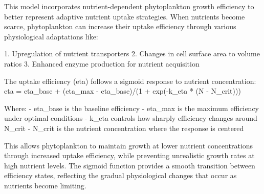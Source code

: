 This model incorporates nutrient-dependent phytoplankton growth efficiency to better represent adaptive nutrient uptake strategies. When nutrients become scarce, phytoplankton can increase their uptake efficiency through various physiological adaptations like:

1. Upregulation of nutrient transporters
2. Changes in cell surface area to volume ratios
3. Enhanced enzyme production for nutrient acquisition

The uptake efficiency (eta) follows a sigmoid response to nutrient concentration:
eta = eta_base + (eta_max - eta_base)/(1 + exp(-k_eta * (N - N_crit)))

Where:
- eta_base is the baseline efficiency
- eta_max is the maximum efficiency under optimal conditions
- k_eta controls how sharply efficiency changes around N_crit
- N_crit is the nutrient concentration where the response is centered

This allows phytoplankton to maintain growth at lower nutrient concentrations through increased uptake efficiency, while preventing unrealistic growth rates at high nutrient levels. The sigmoid function provides a smooth transition between efficiency states, reflecting the gradual physiological changes that occur as nutrients become limiting.
